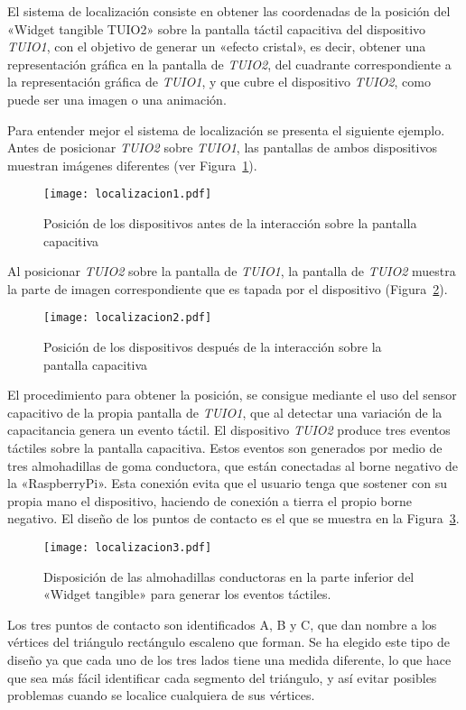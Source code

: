 El sistema de localización consiste en obtener las coordenadas de la posición del «Widget tangible TUIO2» sobre la pantalla táctil capacitiva del dispositivo \emph{TUIO1}, con el objetivo de generar un «efecto cristal», es decir, obtener una representación gráfica en la pantalla de \emph{TUIO2}, del cuadrante correspondiente a la representación gráfica de \emph{TUIO1}, y que cubre el dispositivo \emph{TUIO2}, como puede ser una imagen o una animación.\

Para entender mejor el sistema de localización se presenta el siguiente ejemplo. Antes de posicionar \emph{TUIO2} sobre \emph{TUIO1}, las pantallas de ambos dispositivos muestran imágenes diferentes (ver Figura~\ref{fig:Localizacion1}).
\begin{figure}[!h]
\begin{center}
\texttt{[image: localizacion1.pdf]}
\caption{Posición de los dispositivos antes de la interacción sobre la pantalla capacitiva}
\label{fig:Localizacion1}
\end{center}
\end{figure}
Al posicionar \emph{TUIO2} sobre la pantalla de \emph{TUIO1}, la pantalla de \emph{TUIO2} muestra la parte de imagen correspondiente que es tapada por el dispositivo (Figura~\ref{fig:Localizacion2}).
\begin{figure}[!h]
\begin{center}
\texttt{[image: localizacion2.pdf]}
\caption{Posición de los dispositivos después de la interacción sobre la pantalla capacitiva}
\label{fig:Localizacion2}
\end{center}
\end{figure}

El procedimiento para obtener la posición, se consigue mediante el uso del sensor capacitivo de la propia pantalla de \emph{TUIO1}, que al detectar una variación de la capacitancia genera un evento táctil.
El dispositivo \emph{TUIO2} produce tres eventos táctiles sobre la pantalla capacitiva. Estos eventos son generados por medio de tres almohadillas de goma conductora, que están conectadas al borne negativo de la «RaspberryPi». Esta conexión evita que el usuario tenga que sostener con su propia mano el dispositivo, haciendo de conexión a tierra el propio borne negativo.
El diseño de los puntos de contacto es el que se muestra en la Figura~\ref{fig:Localizacion3}.
\begin{figure}[!h]
\begin{center}
\texttt{[image: localizacion3.pdf]}
\caption{Disposición de las almohadillas conductoras en la parte inferior del «Widget tangible» para generar los eventos táctiles. }
\label{fig:Localizacion3}
\end{center}
\end{figure}
Los tres puntos de contacto son identificados A, B y C, que dan nombre a los vértices del triángulo rectángulo escaleno que forman. Se ha elegido este tipo de diseño ya que cada uno de los tres lados tiene una medida diferente, lo que hace que sea más fácil identificar cada segmento del triángulo, y así evitar posibles problemas cuando se localice cualquiera de sus vértices.

